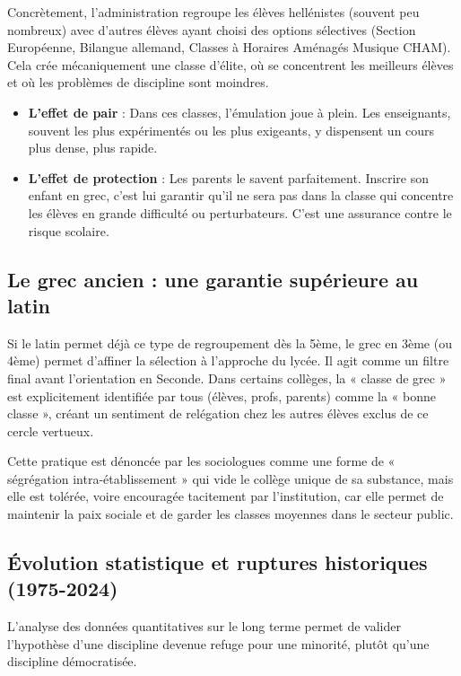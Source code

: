 Concrètement, l'administration regroupe les élèves hellénistes (souvent peu nombreux) avec d'autres
élèves ayant choisi des options sélectives (Section Européenne, Bilangue allemand, Classes à
Horaires Aménagés Musique \- CHAM). Cela crée mécaniquement une classe d'élite, où se concentrent
les meilleurs élèves et où les problèmes de discipline sont moindres.

\begin{itemize}\item \textbf{L'effet de pair} : Dans ces classes, l'émulation joue à plein. Les enseignants, souvent les plus expérimentés ou les plus exigeants, y dispensent un cours plus dense, plus rapide.\cite{I-3-1-ref38}\item \textbf{L'effet de protection} : Les parents le savent parfaitement. Inscrire son enfant en grec, c'est lui garantir qu'il ne sera pas dans la classe qui concentre les élèves en grande difficulté ou perturbateurs. C'est une assurance contre le risque scolaire.\end{itemize}

\subsection{Le grec ancien : une garantie supérieure au latin}

Si le latin permet déjà ce type de regroupement dès la 5ème, le grec en 3ème (ou 4ème) permet
d'affiner la sélection à l'approche du lycée. Il agit comme un filtre final avant l'orientation en
Seconde. Dans certains collèges, la « classe de grec » est explicitement identifiée par tous
(élèves, profs, parents) comme la « bonne classe », créant un sentiment de relégation chez les
autres élèves exclus de ce cercle vertueux.\cite{I-3-1-ref11}

Cette pratique est dénoncée par les sociologues comme une forme de « ségrégation intra-établissement
» qui vide le collège unique de sa substance, mais elle est tolérée, voire encouragée tacitement par
l'institution, car elle permet de maintenir la paix sociale et de garder les classes moyennes dans
le secteur public.\cite{I-3-1-ref5}



\subsection{Évolution statistique et ruptures historiques (1975-2024)}

L'analyse des données quantitatives sur le long terme permet de valider l'hypothèse d'une discipline
devenue refuge pour une minorité, plutôt qu'une discipline démocratisée.



